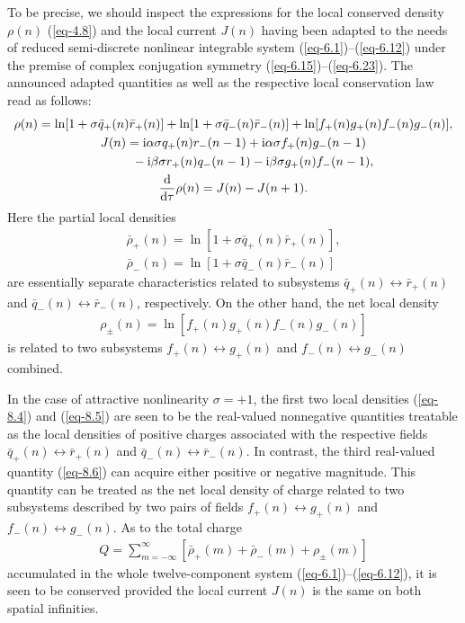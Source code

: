 \documentclass[pdftex]{sigma}
\numberwithin{equation}{section}
\begin{document}
To be precise, we should inspect the expressions for the local conserved density $\rho(n)$ (\ref{eq-4.8}) and the local current $J(n)$ having been adapted to the needs of reduced semi-discrete nonlinear integrable system (\ref{eq-6.1})--(\ref{eq-6.12}) under the premise of complex conjugation symmetry (\ref{eq-6.15})--(\ref{eq-6.23}). The announced adapted quantities as well as the respective local conservation law read as follows:
\begin{gather}%
	\rho(n) = \ln[1+\sigma\bar{q}_{+}(n)\bar{r}_{+}(n)] + \ln[1+\sigma\bar{q}_{-}(n)\bar{r}_{-}(n)] + \ln[f_{+}(n)g_{+}(n)f_{-}(n)g_{-}(n)],\nonumber
\\
	J(n)=\mathrm{i}\alpha\sigma q_{+}(n)r_{-}(n-1)+\mathrm{i}\alpha\sigma f_{+}(n)g_{-}(n-1)\nonumber\\
\hphantom{J(n)=}{}
 -\mathrm{i}\beta\sigma r_{+}(n)q_{-}(n-1) - \mathrm{i}\beta\sigma g_{+}(n)f_{-}(n-1),\label{eq-8.2}
\\ %
	\frac{\mathrm{d}}{\mathrm{d}\tau}\rho(n) = J(n) - J(n+1) .\nonumber
\end{gather}
Here the partial local densities
\begin{gather}\label{eq-8.4}
	\bar{\rho}_{+}(n) = \ln[1+\sigma\bar{q}_{+}(n)\bar{r}_{+}(n)],
\\
\label{eq-8.5}
	\bar{\rho}_{-}(n) = \ln[1+\sigma\bar{q}_{-}(n)\bar{r}_{-}(n)]
\end{gather}
are essentially separate characteristics related to subsystems
 $\bar{q}_{+}(n)\leftrightarrow \bar{r}_{+}(n)$ and $\bar{q}_{-}(n)\leftrightarrow \bar{r}_{-}(n)$, respectively.
On the other hand, the net local density
\begin{gather}\label{eq-8.6}
	\rho_{\pm}(n) = \ln[f_{+}(n)g_{+}(n)f_{-}(n)g_{-}(n)]
\end{gather}
is related to two subsystems $f_{+}(n)\leftrightarrow g_{+}(n)$ and $f_{-}(n) \leftrightarrow g_{-}(n)$ combined.

In the case of attractive nonlinearity $\sigma=+1$, the first two local densities (\ref{eq-8.4}) and (\ref{eq-8.5}) are seen to be the real-valued nonnegative quantities treatable as the local densities of positive charges associated with the respective fields $\bar{q}_{+}(n)\leftrightarrow \bar{r}_{+}(n)$ and $\bar{q}_{-}(n)\leftrightarrow \bar{r}_{-}(n)$. In contrast, the third real-valued quantity (\ref{eq-8.6}) can acquire either positive or negative magnitude. This quantity can be treated as the net local density of charge related to two subsystems described by two pairs of fields $f_{+}(n)\leftrightarrow g_{+}(n)$ and $f_{-}(n) \leftrightarrow g_{-}(n)$. As to the total charge
\begin{gather}\label{eq-8.7}
	Q = \sum_{m=-\infty}^\infty [\bar{\rho}_{+}(m) + \bar{\rho}_{-}(m) + \rho_{\pm}(m)]
\end{gather}
accumulated in the whole twelve-component system (\ref{eq-6.1})--(\ref{eq-6.12}), it is seen to be conserved provided the local current $J(n)$ is the same on both spatial infinities.
\end{document}
